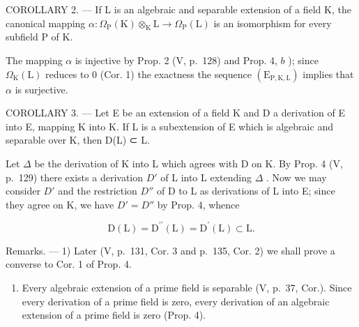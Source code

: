 COROLLARY 2. --- If L is an algebraic and separable extension of a field K, the canonical mapping \(\alpha: \Omega_{\mathrm{P}}(\mathrm{K}) \otimes_{\mathrm{K}} \mathrm{L} \to \Omega_{\mathrm{P}}(\mathrm{L})\) is an isomorphism for every subfield P of K.

The mapping \(\alpha\) is injective by Prop. 2 (V, p.~128) and Prop. 4, \(b\) ); since \(\Omega_{\mathrm{K}}(\mathrm{L})\) reduces to 0 (Cor. 1) the exactness the sequence \((\mathrm{E}_{\mathrm{P},\mathrm{K},\mathrm{L}})\) implies that \(\alpha\) is surjective.

COROLLARY 3. --- Let E be an extension of a field K and D a derivation of E into E, mapping K into K. If L is a subextension of E which is algebraic and separable over K, then D(L) ⊂ L.

Let \(\Delta\) be the derivation of K into L which agrees with D on K. By Prop. 4 (V, p.~129) there exists a derivation \(D'\) of L into L extending \(\Delta\) . Now we may consider \(D'\) and the restriction \(D''\) of D to L as derivations of L into E; since they agree on K, we have \(D' = D''\) by Prop. 4, whence

\[
\mathrm{D} (\mathrm{L}) = \mathrm{D} ^ {\prime \prime} (\mathrm{L}) = \mathrm{D} ^ {\prime} (\mathrm{L}) \subset \mathrm{L}.
\]

Remarks. --- 1) Later (V, p.~131, Cor. 3 and p.~135, Cor. 2) we shall prove a converse to Cor. 1 of Prop. 4.

\begin{enumerate}
\def\labelenumi{\arabic{enumi})}
\setcounter{enumi}{1}
\tightlist
\item
  Every algebraic extension of a prime field is separable (V, p.~37, Cor.). Since every derivation of a prime field is zero, every derivation of an algebraic extension of a prime field is zero (Prop. 4).
\end{enumerate}

